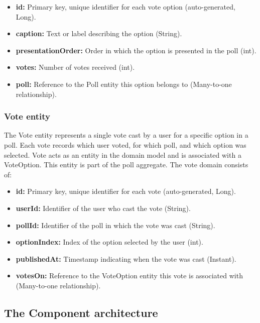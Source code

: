 \begin{itemize}
    \item \textbf{id:} Primary key, unique identifier for each vote option (auto-generated, Long).
    \item \textbf{caption:} Text or label describing the option (String).
    \item \textbf{presentationOrder:} Order in which the option is presented in the poll (int).
    \item \textbf{votes:} Number of votes received (int).
    \item \textbf{poll:} Reference to the Poll entity this option belongs to (Many-to-one relationship).

\end{itemize}

\subsubsection{Vote entity}

The Vote entity represents a single vote cast by a user for a specific option in a poll. Each vote records which user voted, for which poll, and which option was selected. Vote acts as an entity in the domain model and is associated with a VoteOption. This entity is part of the poll aggregate.
The vote domain consists of:

\begin{itemize}
    \item \textbf{id:} Primary key, unique identifier for each vote (auto-generated, Long).
    \item \textbf{userId:} Identifier of the user who cast the vote (String).
    \item \textbf{pollId:} Identifier of the poll in which the vote was cast (String).
    \item \textbf{optionIndex:} Index of the option selected by the user (int).
    \item \textbf{publishedAt:} Timestamp indicating when the vote was cast (Instant).
    \item \textbf{votesOn:} Reference to the VoteOption entity this vote is associated with (Many-to-one relationship).

\end{itemize}


\subsection{The Component architecture}


